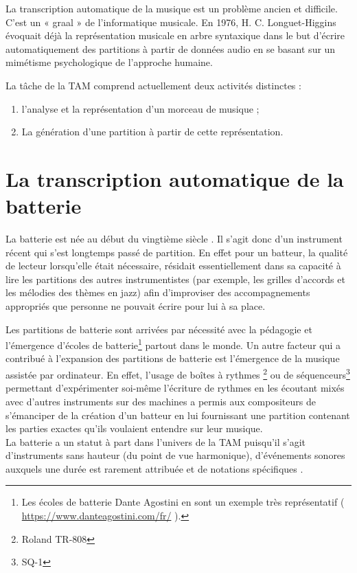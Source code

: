 La transcription automatique de la musique est un problème ancien et difficile.
C’est un « graal » de l’informatique musicale. En 1976, H. C. Longuet-Higgins
\cite{first_one} évoquait déjà la représentation musicale en arbre syntaxique
dans le but d’écrire automatiquement des partitions à partir de données audio
en se basant sur un mimétisme psychologique de l’approche humaine.

La tâche de la TAM comprend actuellement deux activités distinctes :
\begin{enumerate}
    \item l’analyse et la représentation d’un morceau de musique ;
    \item La génération d’une partition à partir de cette représentation.
\end{enumerate}

\section{La transcription automatique de la batterie}
La batterie est née au début du vingtième siècle \cite{histoire_drum_1}. Il
s’agit donc d’un instrument récent qui s’est longtemps passé de partition. En
effet pour un batteur, la qualité de lecteur lorsqu’elle était nécessaire,
résidait essentiellement dans sa capacité à lire les partitions des autres
instrumentistes (par exemple, les grilles d’accords et les mélodies des thèmes
en jazz) afin d’improviser des accompagnements appropriés que personne ne
pouvait écrire pour lui à sa place.
 
Les partitions de batterie sont arrivées par nécessité avec la pédagogie et
l’émergence d’écoles de batterie\footnote{Les écoles de batterie Dante Agostini
en sont un exemple très représentatif (\url{ https://www.danteagostini.com/fr/}
).} partout dans le monde. Un autre facteur qui a contribué à l’expansion des
partitions de batterie est l’émergence de la musique assistée par ordinateur.
En effet, l’usage de boîtes à rythmes \footnote{Roland TR-808} ou de
séquenceurs\footnote{SQ-1} permettant d’expérimenter soi-même l’écriture de
rythmes en les écoutant mixés avec d’autres instruments sur des machines a
permis aux compositeurs de s’émanciper de la création d’un batteur en lui
fournissant une partition contenant les parties exactes qu’ils voulaient
entendre sur leur musique.\\

La batterie a un statut à part dans l’univers de la TAM puisqu’il s’agit
d’instruments sans hauteur (du point de vue harmonique), d’événements sonores
auxquels une durée est rarement attribuée et de notations spécifiques
\cite{Review_ADT}.

